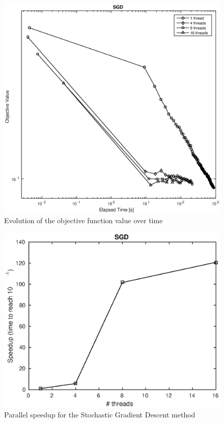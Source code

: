 \documentclass{article}
\begin{document}
\begin{figure}[!htbp]
	\centering
	\includegraphics[scale=0.5]{figs/sgd_objective.eps}
	\caption{Evolution of the objective function value over time}
	\label{fig:sgd_objective}
\end{figure}

\begin{figure}[!htbp]
	\centering
	\includegraphics[scale=0.5]{figs/sgd_speedup.eps}
	\caption{Parallel speedup for the Stochastic Gradient Descent method}
	\label{fig:sgd_speedup}
\end{figure}
\end{document}
